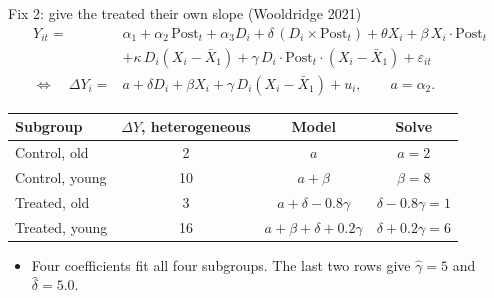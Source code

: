 \documentclass[
  11pt,
  ignorenonframetext,
  aspectratio=169,
]{beamer}
\providecommand{\tightlist}{%
  \setlength{\itemsep}{0pt}\setlength{\parskip}{0pt}}
\begin{document}
\begin{frame}{Fix 2: give the treated their own slope (Wooldridge 2021)}
\protect{}\label{fix-2-give-the-treated-their-own-slope-wooldridge-2021}
\[
\begin{aligned}
Y_{it} = {}& \alpha_1 + \alpha_2\,\text{Post}_t + \alpha_3 D_i + \delta\,(D_i \times \text{Post}_t) + \theta X_i + \beta\, X_i \cdot \text{Post}_t \\
& + \kappa\, D_i (X_i - \bar X_1) + \gamma\, D_i \cdot \text{Post}_t \cdot (X_i - \bar X_1) + \varepsilon_{it} \\
\Longleftrightarrow\quad \Delta Y_i = {}& a + \delta D_i + \beta X_i + \gamma\, D_i (X_i - \bar X_1) + u_i, \qquad a = \alpha_2 .
\end{aligned}
\]

\begin{center}\small
\begin{tabular}{lccc}
\toprule
Subgroup & $\Delta Y$, heterogeneous & Model & Solve \\
\midrule
Control, old & 2 & $a$ & $a = 2$ \\
Control, young & 10 & $a + \beta$ & $\beta = 8$ \\
Treated, old & 3 & $a + \delta - 0.8\gamma$ & $\delta - 0.8\gamma = 1$ \\
Treated, young & 16 & $a + \beta + \delta + 0.2\gamma$ & $\delta + 0.2\gamma = 6$ \\
\bottomrule
\end{tabular}
\end{center}

\begin{itemize}
\tightlist
\item
  Four coefficients fit all four subgroups. The last two rows give
  \(\hat\gamma = 5\) and \(\hat\delta = 5.0\).
\end{itemize}
\end{frame}
\end{document}
